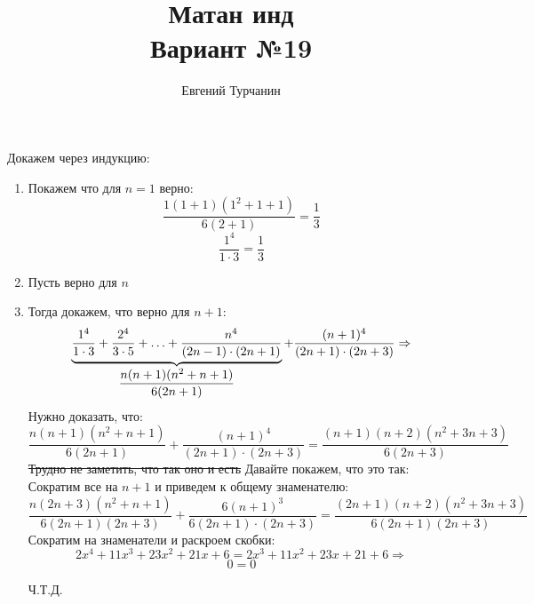 \documentclass{report}
\title{\Huge{Матан инд}\\ Вариант №19}
\author{\huge{Евгений Турчанин}}
\date{}
\begin{document}
\maketitle

\sol
Докажем через индукцию:\\
\begin{enumerate}
	\item Покажем что для $n=1$ верно: \\ 
		\begin{equation*}
		\dfrac{1(1+1)(1^2+1+1)}{6(2+1)}=\dfrac{1}{3}
		\end{equation*}
		\begin{equation*}
		\dfrac{1^4}{1\cdot3}=\dfrac{1}{3}
		\end{equation*}
	\item Пусть верно для $n$ \\
	\item Тогда докажем, что верно для $n+1$:
		\begin{equation*}
			\underbrace{\dfrac{1^4}{1\cdot3}+\dfrac{2^4}{3\cdot5}+\mathellipsis+\dfrac{n^4}{(2n-1)\cdot(2n+1)}}_{\dfrac{n(n+1)(n^2+n+1)}{6(2n+1)}}+\dfrac{(n+1)^4}{(2n+1)\cdot(2n+3)} \Rightarrow
		\end{equation*}
		Нужно доказать, что:
		\begin{equation*}
		\dfrac{n(n+1)(n^2+n+1)}{6(2n+1)}+\dfrac{(n+1)^4}{(2n+1)\cdot(2n+3)} = 
		\dfrac{(n+1)(n+2)(n^2+3n+3)}{6(2n+3)}
		\end{equation*}
		\sout{Трудно не заметить, что так оно и есть}
		Давайте покажем, что это так:\\
		Сократим все на $n+1$ и приведем к общему знаменателю:
		\begin{equation*}
		\dfrac{n(2n+3)(n^2+n+1)}{6(2n+1)(2n+3)}+\dfrac{6(n+1)^3}{6(2n+1)\cdot(2n+3)} = 
		\dfrac{(2n+1)(n+2)(n^2+3n+3)}{6(2n+1)(2n+3)}
		\end{equation*}
		Сократим на знаменатели и раскроем скобки:
		\begin{equation*}
		2x^4+11x^3+23x^2+21x+6=2x^3+11x^2+23x+21+6 \Rightarrow
		\end{equation*}
		\begin{equation*}
		0=0
		\end{equation*}
		\begin{center}
			Ч.Т.Д.
		\end{center}

\end{enumerate}
\end{document}
